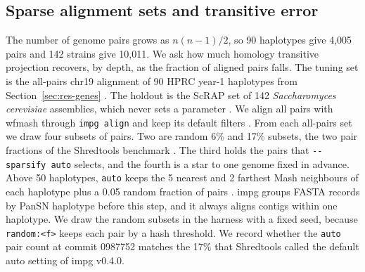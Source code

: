 \subsection{Sparse alignment sets and transitive error}
\label{sec:res-sparse}

The number of genome pairs grows as $n(n-1)/2$, so 90 haplotypes give 4,005 pairs and 142 strains give 10,011.
We ask how much homology transitive projection recovers, by depth, as the fraction of aligned pairs falls.
The tuning set is the all-pairs chr19 alignment of 90 HPRC year-1 haplotypes from Section~\ref{sec:res-genes} \citep{Liao2023hprc}.
The holdout is the ScRAP set of 142 \textit{Saccharomyces cerevisiae} assemblies, which never sets a parameter \citep{ODonnell2023scrap}.
We align all pairs with wfmash through \texttt{impg align} and keep its default filters \citep{Guarracino2024wfmash,Garrison2026sweepga}.
From each all-pairs set we draw four subsets of pairs.
Two are random 6\% and 17\% subsets, the two pair fractions of the Shredtools benchmark \citep{Shivakumar2026shredtools}.
The third holds the pairs that \texttt{-{}-sparsify auto} selects, and the fourth is a star to one genome fixed in advance.
Above 50 haplotypes, \texttt{auto} keeps the 5 nearest and 2 farthest Mash neighbours of each haplotype plus a 0.05 random fraction of pairs \citep{Ondov2016mash}.
impg groups FASTA records by PanSN haplotype before this step, and it always aligns contigs within one haplotype.
We draw the random subsets in the harness with a fixed seed, because \texttt{random:<f>} keeps each pair by a hash threshold.
We record whether the \texttt{auto} pair count at commit 0987752 matches the 17\% that Shredtools called the default auto setting of impg v0.4.0.
